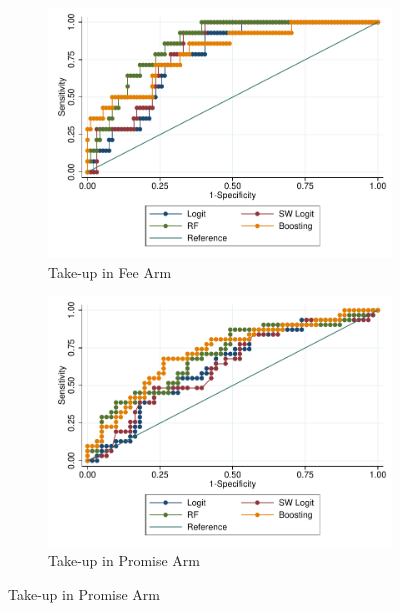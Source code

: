 \documentclass[11pt]{article}
\begin{document}
\vspace{.1in}
\begin{figure}[H]
    \caption{Out of sample ROC curve}
    \label{roc_curve}
    \begin{center}
    \begin{subfigure}{0.45\textwidth}
        \caption{Take-up in Fee Arm}
        \centering
        \includegraphics[width=\textwidth]{Figuras/Boost/ROC_curve_outsample_pago_frec_vol_fee.pdf}
    \end{subfigure}
    \begin{subfigure}{0.45\textwidth}
        \caption{Take-up in Promise Arm}
        \centering
        \includegraphics[width=\textwidth]{Figuras/Boost/ROC_curve_outsample_pago_frec_vol_promise.pdf}
    \end{subfigure}
    \end{center}
     \scriptsize 
\end{figure}
\end{document}
